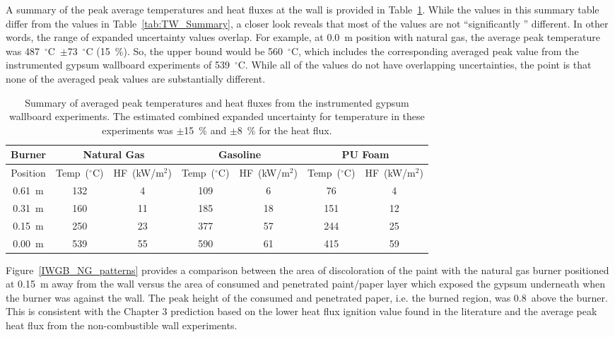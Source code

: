 \documentclass[twoside]{uocthesis}
\begin{document}
{A summary of the peak average temperatures and heat fluxes at the wall is provided in Table~\ref{tab:IWGB_Summary}. While the values in this summary table differ from the values in Table~\ref{tab:TW_Summary}, a closer look reveals that most of the values are not ``significantly '' different.  In other words, the range of expanded uncertainty values overlap.  For example, at 0.0~m position with natural gas, the average peak temperature was 487~$^\circ$C~$\pm$73~$^\circ$C (15~\%). So, the upper bound would be 560~$^\circ$C, which includes the corresponding averaged peak value from the instrumented gypsum wallboard experiments of 539~$^\circ$C.  While all of the values do not have overlapping uncertainties, the point is that none of the averaged peak values are substantially different.        

\begin{table}
	\centering
	\scriptsize
	\begin{tabular}{|c|c|c|c|c|c|c|}
		\hline {Burner} & \multicolumn{2}{c}{Natural Gas} & \multicolumn{2}{c}{Gasoline} & \multicolumn{2}{c|}{PU Foam} \\
		\hline  Position & Temp~($^\circ$C) & HF~(kW/m$^{2}$) & Temp~($^\circ$C) & HF~(kW/m$^{2}$) & Temp~($^\circ$C) & HF~(kW/m$^{2}$) 	\\
		\hline \hline 0.61~m & 132 & 4 & 109 & 6 & 76 & 4 \\
		\hline 0.31~m & 160 & 11 & 185 & 18 & 151 & 12	\\
		\hline 0.15~m & 250 & 23 & 377 & 57 & 244 & 25	\\
		\hline 0.00~m & 539 & 55 & 590 & 61 & 415 & 59 	\\
		\hline
	\end{tabular}
	\caption[Summary of instrumented gypsum wallboard experiments]{Summary of averaged peak temperatures and heat fluxes from the instrumented gypsum wallboard experiments.  The estimated combined expanded uncertainty for temperature in these experiments was $\pm$15~\% and $\pm$8~\% for the heat flux.} 
	\label{tab:IWGB_Summary}
\end{table}

Figure~\ref{IWGB_NG_patterns} provides a comparison between the area of discoloration of the paint with the natural gas burner positioned at 0.15~m away from the wall versus the area of consumed and penetrated paint/paper layer which exposed the gypsum underneath when the burner was against the wall. The peak height of the consumed and penetrated paper, i.e. the burned region, was 0.8~above the burner.  This is consistent with the Chapter 3 prediction based on the lower heat flux ignition value found in the literature and the average peak heat flux from the non-combustible wall experiments. 

}
\end{document}
